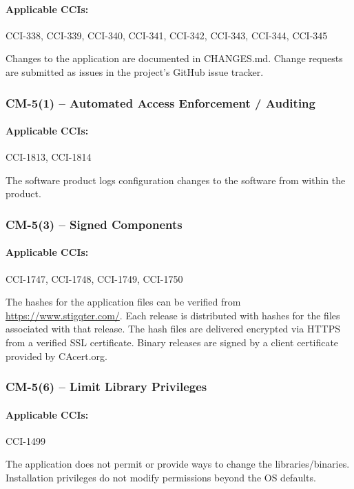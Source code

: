 \documentclass[letterpaper, 10pt, twoside]{article}
\begin{document}
\paragraph{Applicable CCIs:} CCI-338, CCI-339, CCI-340, CCI-341, CCI-342, CCI-343, CCI-344, CCI-345

Changes to the application are documented in CHANGES.md. Change requests are submitted as issues in the project's GitHub issue tracker.

\subsubsection{CM-5(1) -- Automated Access Enforcement / Auditing}

\paragraph{Applicable CCIs:} CCI-1813, CCI-1814

The software product logs configuration changes to the software from within the product.

\subsubsection{CM-5(3) -- Signed Components}

\paragraph{Applicable CCIs:} CCI-1747, CCI-1748, CCI-1749, CCI-1750

The hashes for the application files can be verified from \url{https://www.stigqter.com/}. Each release is distributed with hashes for the files associated with that release. The hash files are delivered encrypted via HTTPS from a verified SSL certificate. Binary releases are signed by a client certificate provided by CAcert.org.

\subsubsection{CM-5(6) -- Limit Library Privileges}

\paragraph{Applicable CCIs:} CCI-1499

The application does not permit or provide ways to change the libraries/binaries. Installation privileges do not modify permissions beyond the OS defaults.
\end{document}

